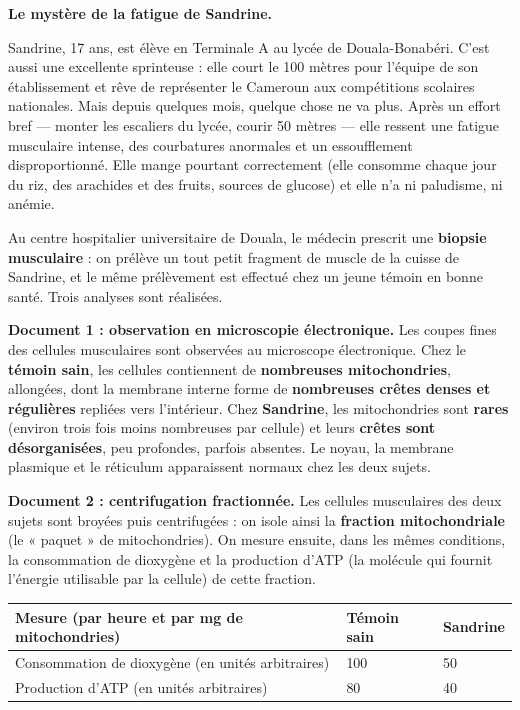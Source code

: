 \documentclass[11pt]{article}
\newcommand{\cle}[1]{{\popxbold\color{popdark}#1}}
\newcounter{popsec}
\newcounter{popsub}
\newcommand{\courssub}[1]{%
  \stepcounter{popsub}%
  \par\vspace{9pt}\noindent{\popxbold\fontsize{11.5}{13}\selectfont\color{popink}{\color{poporange}\thepopsec.\thepopsub}\hspace{6pt}#1}\par\nopagebreak\vspace{4pt}
}
\begin{document}
\courssub{Situation}

\textbf{Le mystère de la fatigue de Sandrine.}

Sandrine, 17 ans, est élève en Terminale A au lycée de Douala-Bonabéri. C'est aussi une excellente sprinteuse : elle court le 100 mètres pour l'équipe de son établissement et rêve de représenter le Cameroun aux compétitions scolaires nationales. Mais depuis quelques mois, quelque chose ne va plus. Après un effort bref — monter les escaliers du lycée, courir 50 mètres — elle ressent une \cle{fatigue musculaire intense}, des courbatures anormales et un essoufflement disproportionné. Elle mange pourtant correctement (elle consomme chaque jour du riz, des arachides et des fruits, sources de glucose) et elle n'a ni paludisme, ni anémie.

Au centre hospitalier universitaire de Douala, le médecin prescrit une \textbf{biopsie musculaire} : on prélève un tout petit fragment de muscle de la cuisse de Sandrine, et le même prélèvement est effectué chez un jeune témoin en bonne santé. Trois analyses sont réalisées.

\textbf{Document 1 : observation en microscopie électronique.} Les coupes fines des cellules musculaires sont observées au microscope électronique. Chez le \textbf{témoin sain}, les cellules contiennent de \textbf{nombreuses mitochondries}, allongées, dont la membrane interne forme de \textbf{nombreuses crêtes denses et régulières} repliées vers l'intérieur. Chez \textbf{Sandrine}, les mitochondries sont \textbf{rares} (environ trois fois moins nombreuses par cellule) et leurs \textbf{crêtes sont désorganisées}, peu profondes, parfois absentes. Le noyau, la membrane plasmique et le réticulum apparaissent normaux chez les deux sujets.

\textbf{Document 2 : centrifugation fractionnée.} Les cellules musculaires des deux sujets sont broyées puis centrifugées : on isole ainsi la \textbf{fraction mitochondriale} (le « paquet » de mitochondries). On mesure ensuite, dans les mêmes conditions, la consommation de dioxygène et la production d'ATP (la molécule qui fournit l'énergie utilisable par la cellule) de cette fraction.

\begin{center}
\begin{tabularx}{\linewidth}{|l|X|X|}
\hline
\rowcolor{popblueL} \textbf{Mesure (par heure et par mg de mitochondries)} & \textbf{Témoin sain} & \textbf{Sandrine} \\
\hline
Consommation de dioxygène (en unités arbitraires) & 100 & 50 \\
\hline
Production d'ATP (en unités arbitraires) & 80 & 40 \\
\hline
\end{tabularx}
\end{center}
\end{document}
